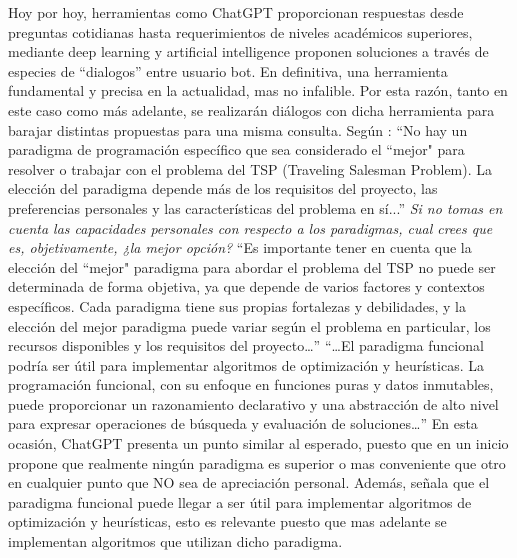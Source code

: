                 Hoy por hoy, herramientas como ChatGPT proporcionan respuestas desde preguntas cotidianas hasta requerimientos de niveles académicos superiores, mediante deep learning y artificial intelligence proponen soluciones a través de especies de “dialogos” entre usuario bot. En definitiva, una herramienta fundamental y precisa en la actualidad, mas no infalible.
                \newline
                \newline
                Por esta razón, tanto en este caso como más adelante, se realizarán diálogos con dicha herramienta para barajar distintas propuestas para una misma consulta.
                \newline
                \newline
                Según \parencite{GPTPARADIGMAS}: “No hay un paradigma de programación específico que sea considerado el “mejor" para resolver o trabajar con el problema del TSP (Traveling Salesman Problem). La elección del paradigma depende más de los requisitos del proyecto, las preferencias personales y las características del problema en sí...”      \textit{Si no tomas en cuenta las capacidades personales con respecto a los paradigmas, cual crees que es, objetivamente, ¿la mejor opción?}
                \newline
                \newline
                “Es importante tener en cuenta que la elección del “mejor" paradigma para abordar el problema del TSP no puede ser determinada de forma objetiva, ya que depende de varios factores y contextos específicos. Cada paradigma tiene sus propias fortalezas y debilidades, y la elección del mejor paradigma puede variar según el problema en particular, los recursos disponibles y los requisitos del proyecto…”
                \newline
                \newline
                “…El paradigma funcional podría ser útil para implementar algoritmos de optimización y heurísticas. La programación funcional, con su enfoque en funciones puras y datos inmutables, puede proporcionar un razonamiento declarativo y una abstracción de alto nivel para expresar operaciones de búsqueda y evaluación de soluciones…”
                \newline
                \newline
                En esta ocasión, ChatGPT presenta un punto similar al esperado, puesto que en un inicio propone que realmente ningún paradigma es superior o mas conveniente que otro en cualquier punto que NO sea de apreciación personal. Además, señala que el paradigma funcional puede llegar a ser útil para implementar algoritmos de optimización y heurísticas, esto es relevante puesto que mas adelante se implementan algoritmos que utilizan dicho paradigma.
